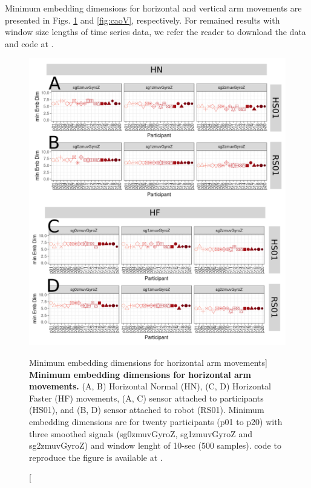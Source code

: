 Minimum embedding dimensions for horizontal and vertical arm movements
are presented in Figs.  \ref{fig:caoH} and \ref{fig:caoV}, respectively.
For remained  results with window size lengths of time series data, we refer
the reader to download the data and code at \cite{xochicale2019}.


\begin{figure}
\centering
\includegraphics[width=1.0\textwidth]{cao_aHw10}
	\caption
	[Minimum embedding dimensions for horizontal arm movements]{
	{\bf Minimum embedding dimensions for horizontal arm movements.} 
		(A, B) Horizontal Normal (HN), (C, D) Horizontal Faster (HF) 
		movements,
		(A, C) sensor attached to participants (HS01), and
		(B, D) sensor attached to robot (RS01).
		Minimum embedding dimensions are for twenty participants 
		(p01 to p20) with three smoothed signals 
		(sg0zmuvGyroZ, sg1zmuvGyroZ and sg2zmuvGyroZ)
		and window lenght of 10-sec (500 samples).
	\R code to reproduce the figure is available at 
	.
        }
    \label{fig:caoH}
\end{figure}

